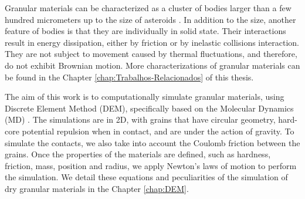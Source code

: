 
    Granular materials can be characterized as a cluster of bodies larger than a few hundred micrometers up to the size of asteroids \cite{Sands_Powders_and_Grains, The_Physics_of_Granular_Media}. In addition to the size, another feature of bodies is that they are individually in solid state. Their interactions result in energy dissipation, either by friction or by inelastic collisions interaction. They are not subject to movement caused by thermal fluctuations, and therefore, do not exhibit Brownian motion. More characterizations of granular materials can be found in the Chapter \ref{chap:Trabalhos-Relacionados} of this thesis.


    The aim of this work is to computationally simulate granular materials, using Discrete Element Method (DEM), specifically based on the Molecular Dynamics (MD) \cite{Computer_Simulation_of_Liquids}. The simulations are in 2D, with grains that have circular geometry, hard-core potential repulsion when in contact, and are under the action of gravity. To simulate the contacts, we also take into account the Coulomb friction between the grains. Once the properties of the materials are defined, such as hardness, friction, mass, position and radius, we apply Newton's laws of motion to perform the simulation. We detail these equations and peculiarities of the simulation of dry granular materials in the Chapter \ref{chap:DEM}.

